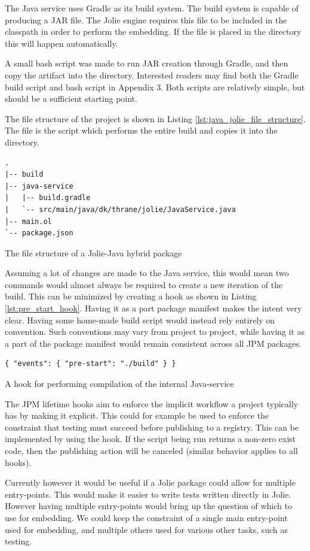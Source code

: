 The Java service uses Gradle as its build system. The build system is capable
of producing a JAR file. The Jolie engine requires this file to be included in
the classpath in order to perform the embedding. If the file is placed in the
 directory this will happen automatically.

A small bash script was made to run JAR creation through Gradle, and then copy
the artifact into the  directory. Interested readers may find both
the Gradle build script and bash script in Appendix 3. Both scripts are
relatively simple, but should be a sufficient starting point.

The file structure of the project is shown in Listing
\ref{lst:java_jolie_file_structure}. The  file is the script which
performs the entire build and copies it into the  directory.

\begin{listing}[H]
\begin{verbatim}
.
|-- build
|-- java-service
|   |-- build.gradle
|   `-- src/main/java/dk/thrane/jolie/JavaService.java
|-- main.ol
`-- package.json
\end{verbatim}
\caption{The file structure of a Jolie-Java hybrid package}
\label{lst:java_jolie_file_structure}
\end{listing}

Assuming a lot of changes are made to the Java service, this would mean two
commands would almost always be required to create a new iteration of the
build. This can be minimized by creating a  hook as shown in
Listing \ref{lst:pre_start_hook}. Having it as a part package manifest makes
the intent very clear. Having some home-made build script would instead rely
entirely on convention. Such conventions may vary from project to project,
while having it as a part of the package manifest would remain consistent
across all JPM packages.

\begin{listing}[H]
\begin{verbatim}
{ "events": { "pre-start": "./build" } }
\end{verbatim}
\caption{A  hook for performing compilation of the internal
    Java-service}
\label{lst:pre_start_hook}
\end{listing}

The JPM lifetime hooks aim to enforce the implicit workflow a project typically
has by making it explicit. This could for example be used to enforce the
constraint that testing must succeed before publishing to a registry. This can
be implemented by using the  hook. If the script being run
returns a non-zero exist code, then the publishing action will be canceled
(similar behavior applies to all  hooks).

Currently however it would be useful if a Jolie package could allow for
multiple entry-points. This would make it easier to write tests written
directly in Jolie. However having multiple entry-points would bring up the
question of which to use for embedding. We could keep the constraint of a
single main entry-point used for embedding, and multiple others used for
various other tasks, such as testing.
